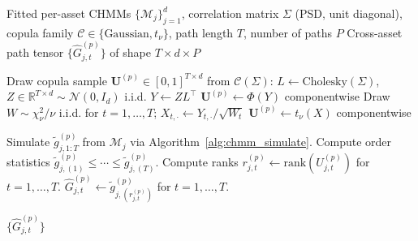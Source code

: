 \begin{algorithm}[tp]
\caption{Cross-asset copula simulation via rank reordering}
\label{alg:copula_sim}
\small
\begin{algorithmic}[1]
\REQUIRE Fitted per-asset CHMMs $\{\mathcal{M}_j\}_{j=1}^d$, correlation matrix $\Sigma$ (PSD, unit diagonal), copula family $\mathcal{C} \in \{\text{Gaussian}, t_\nu\}$, path length $T$, number of paths $P$
\ENSURE Cross-asset path tensor $\{\hat{G}^{(p)}_{j,t}\}$ of shape $T \times d \times P$


    \STATE Draw copula sample $\mathbf{U}^{(p)} \in [0,1]^{T \times d}$ from $\mathcal{C}(\Sigma)$:
    \STATE \quad $L \leftarrow \text{Cholesky}(\Sigma)$, \; $Z \in \mathbb{R}^{T \times d} \sim \mathcal{N}(0, I_d)$ i.i.d.
    \STATE \quad $Y \leftarrow Z L^\top$
        \STATE \quad $\mathbf{U}^{(p)} \leftarrow \Phi(Y)$ componentwise
    \ELSE
        \STATE \quad Draw $W \sim \chi^2_\nu / \nu$ i.i.d. for $t = 1, \dots, T$; \; $X_{t,\cdot} \leftarrow Y_{t,\cdot} / \sqrt{W_t}$
        \STATE \quad $\mathbf{U}^{(p)} \leftarrow t_\nu(X)$ componentwise
    \ENDIF

        \STATE Simulate $\tilde{g}_{j,1:T}^{(p)}$ from $\mathcal{M}_j$ via Algorithm~\ref{alg:chmm_simulate}.
        \STATE Compute order statistics $\tilde{g}_{j,(1)}^{(p)} \leq \cdots \leq \tilde{g}_{j,(T)}^{(p)}$.
        \STATE Compute ranks $r_{j,t}^{(p)} \leftarrow \text{rank}(U_{j,t}^{(p)})$ for $t = 1, \dots, T$.
        \STATE $\hat{G}_{j,t}^{(p)} \leftarrow \tilde{g}_{j,(r_{j,t}^{(p)})}^{(p)}$ for $t = 1, \dots, T$.
    \ENDFOR
\ENDFOR

\RETURN $\{\hat{G}^{(p)}_{j,t}\}$
\end{algorithmic}
\end{algorithm}

